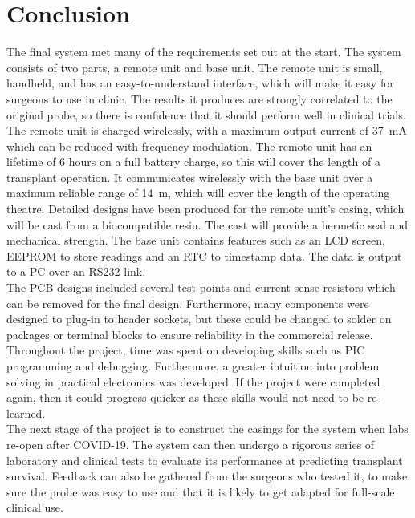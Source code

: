 \section{Conclusion}
The final system met many of the requirements set out at the start. The system consists of two parts, a remote unit and base unit. The remote unit is small, handheld, and has an easy-to-understand interface, which will make it easy for surgeons to use in clinic. The results it produces are strongly correlated to the original probe, so there is confidence that it should perform well in clinical trials. The remote unit is charged wirelessly, with a maximum output current of \SI{37}{\milli\ampere} which can be reduced with frequency modulation. The remote unit has an lifetime of 6 hours on a full battery charge, so this will cover the length of a transplant operation. It communicates wirelessly with the base unit over a maximum reliable range of \SI{14}{\metre}, which will cover the length of the operating theatre. Detailed designs have been produced for the remote unit's casing, which will be cast from a biocompatible resin. The cast will provide a hermetic seal and mechanical strength. The base unit contains features such as an LCD screen, EEPROM to store readings and an RTC to timestamp data. The data is output to a PC over an RS232 link.\\

The PCB designs included several test points and current sense resistors which can be removed for the final design. Furthermore, many components were designed to plug-in to header sockets, but these could be changed to solder on packages or terminal blocks to ensure reliability in the commercial release. Throughout the project, time was spent on developing skills such as PIC programming and debugging. Furthermore, a greater intuition into problem solving in practical electronics was developed. If the project were completed again, then it could progress quicker as these skills would not need to be re-learned. \\

The next stage of the project is to construct the casings for the system when labs re-open after COVID-19. The system can then undergo a rigorous series of laboratory and clinical tests to evaluate its performance at predicting transplant survival. Feedback can also be gathered from the surgeons who tested it, to make sure the probe was easy to use and that it is likely to get adapted for full-scale clinical use.\\